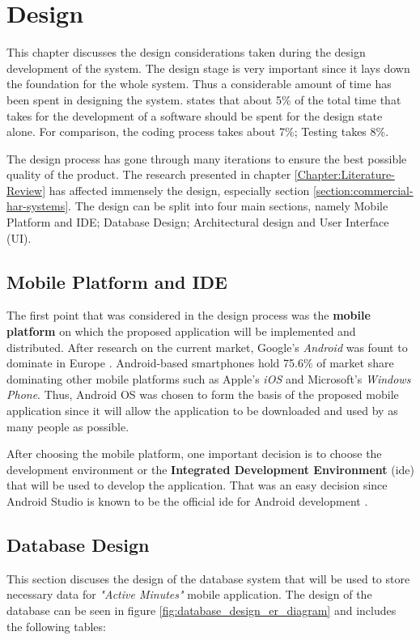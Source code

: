\chapter{Design}
\label{Chapter:Design}

This chapter discusses the design considerations taken during the design development of the system. The design stage is very important since it lays down the foundation for the whole system.
Thus a considerable amount of time has been spent in designing the system. \citet[12]{bell2005} states that about 5\% of the total time that takes for the development of a software should be spent for the design state alone. For comparison, the coding process takes about 7\%; Testing takes 8\%. 

The design process has gone through many iterations to ensure the best possible quality of the product. The research presented in chapter \ref{Chapter:Literature-Review} has affected immensely the design, especially section \ref{section:commercial-har-systems}. The design can be split into four main sections, namely Mobile Platform and IDE; Database Design; Architectural design and User Interface (UI).

    \section{Mobile Platform and IDE}
        The first point that was considered in the design process was the \textbf{mobile platform} on which the proposed application will be implemented and distributed. After research on the current market, Google's \textit{Android} was fount to dominate in Europe \citep{williams2016}. Android-based smartphones hold 75.6\% of market share dominating other mobile platforms such as Apple's \textit{iOS} and Microsoft's \textit{Windows Phone}. Thus, Android OS was chosen to form the basis of the proposed mobile application since it will allow the application to be downloaded and used by as many people as possible.
        
        After choosing the mobile platform, one important decision is to choose the development environment or the \textbf{Integrated Development Environment} (\gls{ide}) that will be used to develop the application. That was an easy decision since Android Studio is known to be the official \gls{ide} for Android development \citep{androidstudio2017}.

    \section{Database Design}
    This section discuses the design of the database system that will be used to store necessary data for \textit{"Active Minutes"} mobile application. The design of the database can be seen in figure \ref{fig:database_design_er_diagram} and includes the following tables:
    
